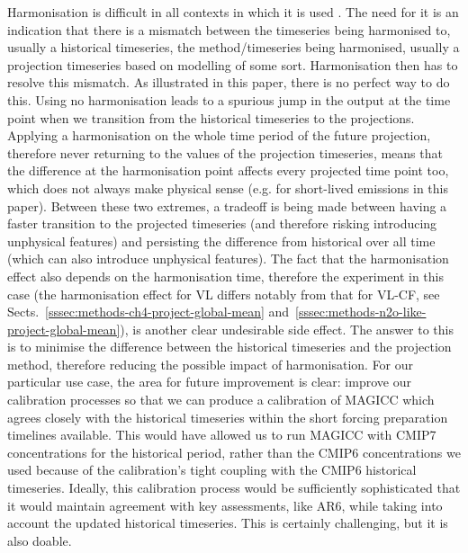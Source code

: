 Harmonisation is difficult in all contexts in which it is used \citep[e.g.][]{gidden_aneris_2018,gidden_cmip6-harmonised-emissions_2019,kikstra_scenariomip-emissions_2026}.
The need for it is an indication that there is a mismatch between the timeseries being harmonised to, usually a historical timeseries,
the method/timeseries being harmonised, usually a projection timeseries based on modelling of some sort.
Harmonisation then has to resolve this mismatch.
As illustrated in this paper, there is no perfect way to do this.
Using no harmonisation leads to a spurious jump in the output
at the time point when we transition from the historical timeseries to the projections.
Applying a harmonisation on the whole time period of the future projection,
therefore never returning to the values of the projection timeseries,
means that the difference at the harmonisation point
affects every projected time point too, which does not always make physical sense (e.g. for short-lived emissions in this paper).
Between these two extremes, a tradeoff is being made between having a faster transition to the projected timeseries (and therefore risking introducing unphysical features)
and persisting the difference from historical over all time (which can also introduce unphysical features).
The fact that the harmonisation effect also depends on the harmonisation time,
therefore the experiment in this case
(the harmonisation effect for VL differs notably from that for VL-CF,
see Sects.~\ref{sssec:methods-ch4-project-global-mean} and~\ref{sssec:methods-n2o-like-project-global-mean}),
is another clear undesirable side effect.
The answer to this is to minimise the difference between the historical timeseries and the projection method,
therefore reducing the possible impact of harmonisation.
For our particular use case, the area for future improvement is clear:
improve our calibration processes so that we can produce a calibration of MAGICC
which agrees closely with the historical timeseries within the short forcing preparation timelines available.
This would have allowed us to run MAGICC with CMIP7 concentrations for the historical period,
rather than the CMIP6 concentrations we used because of the calibration's tight coupling with the CMIP6 historical timeseries.
Ideally, this calibration process would be sufficiently sophisticated that it would maintain agreement with key assessments,
like AR6, while taking into account the updated historical timeseries.
This is certainly challenging, but it is also doable.

